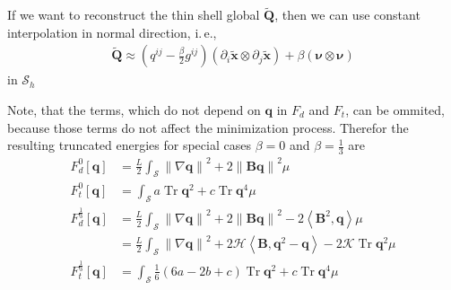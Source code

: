 \documentclass[a4paper,10pt]{scrartcl}
\newcommand{\surf}{\mathcal{S}}
\newcommand{\surfh}{\surf_{h}}
\newcommand{\xb}{\mathbf{x}}
\newcommand{\txb}{\tilde{\xb}}
\newcommand{\nub}{\bm{\nu}}
\newcommand{\Bb}{\mathbf{B}}
\newcommand{\Qb}{\bm{Q}}
\newcommand{\qb}{\bm{q}}
\newcommand{\trace}{\operatorname{Tr}}
\newcommand{\tQb}{\tilde{\Qb}}
\newcommand{\meanc}{\mathcal{H}}
\newcommand{\gaussc}{\mathcal{K}}
\newcommand{\ie}{i.\,e.}%
\begin{document}
  If we want to  reconstruct the thin shell global \( \tQb \), then we can use constant interpolation in normal direction, \ie, 
  \begin{align}
    \tQb \approx \left( q^{ij} - \frac{\beta}{2}g^{ij} \right)\left( \partial_{i}\txb\otimes \partial_{j}\txb\right) + \beta\left( \nub\otimes\nub \right)
  \end{align}
  in \( \surfh \)

  Note, that the terms, which do not depend on \( \qb \) in \( F_{d} \) and \( F_{t} \), can be ommited, because those terms do not affect the minimization process.
  Therefor the resulting truncated energies for special cases \( \beta=0 \) and \( \beta=\frac{1}{3} \) are
  \begin{align}
    F_{d}^{0}[\qb] &=  \frac{L}{2}\int_{\surf} \left\| \nabla\qb \right\|^{2} +2\left\| \Bb\qb \right\|^{2} \mu \\
    F_{t}^{0}[\qb] &= \int_{\surf} a \trace\qb^{2} + c\trace\qb^{4} \mu \\
    F_{d}^{\frac{1}{3}}[\qb] &=  \frac{L}{2}\int_{\surf} \left\| \nabla\qb \right\|^{2} +2\left\| \Bb\qb \right\|^{2} -2 \left\langle \Bb^{2}, \qb \right\rangle\mu \\
                      &= \frac{L}{2}\int_{\surf} \left\| \nabla\qb \right\|^{2} + 2\meanc\left\langle \Bb,\qb^{2} - \qb \right\rangle - 2\gaussc\trace\qb^{2} \mu\\
    F_{t}^{\frac{1}{3}}[\qb] &= \int_{\surf} \frac{1}{6}\left( 6a - 2b +c \right)\trace\qb^{2} + c\trace\qb^{4} \mu
  \end{align}
\end{document}
